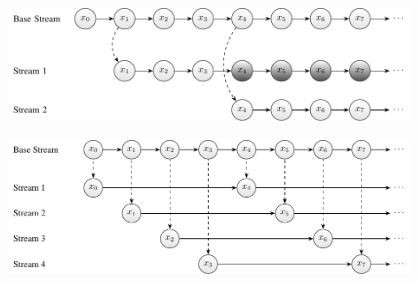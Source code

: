\documentclass{stdlocal}
\begin{document}
  \autocite{lecuyer2017}

  \begin{figure}
    \center
    \includegraphics[width=0.95\textwidth]{figures/seeding_multiple_streams.pdf}
    \caption[Seeding Generation of Multiple Streams]{}
    \label{fig:leapfrogging-multiple-streams}
  \end{figure}

  \begin{figure}
    \center
    \includegraphics[width=0.95\textwidth]{figures/leapfrogging_multiple_streams.pdf}
    \caption[Leapfrogging Generation of Multiple Streams]{}
    \label{fig:leapfrogging-multiple-streams}
  \end{figure}




\end{document}
